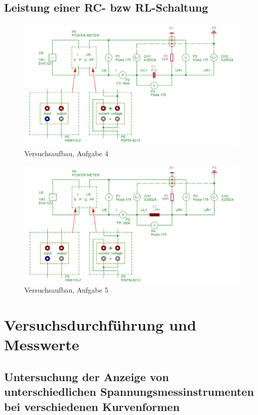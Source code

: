 \documentclass{article}
\begin{document}
\subsection{Leistung einer RC- bzw RL-Schaltung}

\begin{figure}[H]
\centering
\caption{Versuchsaufbau, Aufgabe 4}
\label{fig:aufbau_task4}
\includegraphics[scale=1]{bilder/aufbau_task4.png}
\end{figure}



\begin{figure}[H]
\centering
\caption{Versuchsaufbau, Aufgabe 5}
\label{fig:aufbau_task5}
\includegraphics[scale=1]{bilder/aufbau_task5.png}
\end{figure}




\section{Versuchsdurchführung und Messwerte}

\subsection{Untersuchung  der  Anzeige  von  unterschiedlichen  Spannungsmessinstrumenten  bei verschiedenen Kurvenformen}
\end{document}
